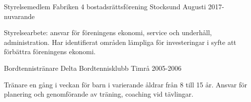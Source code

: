 


\begin{cventries}


\cventry
{Styrelsemedlem} %
{Fabriken 4 bostadsr{\"a}ttsf{\"o}rening} %
{Stocksund} %
{Augusti 2017- nuvarande} %
{ %
\begin{cvitems}
\item {Styrelsearbete: ansvar f{\"o}r f{\"o}reningens ekonomi, service och underh{\aa}ll,  administration.
			Har identifierat omr{\aa}den l{\"a}mpliga f{\"o}r investeringar i syfte att f{\"o}rb{\"a}ttra f{\"o}reningens ekonomi. }
\end{cvitems}
}

\cventry
{Bordtennistr{\"a}nare} %
{Delta Bordtennisklubb} %
{Timr{\aa}} %
{2005-2006} %
{ %
\begin{cvitems}
\item {Tr{\"a}nare en g{\aa}ng i veckan f{\"o}r barn i varierande {\aa}ldrar fr{\aa}n 8 till 15 {\aa}r. Ansvar f{\"o}r planering och genomf{\"o}rande av tr{\"a}ning, coaching vid t{\"a}vlingar.}
\end{cvitems}
}


\end{cventries}